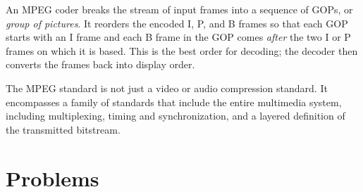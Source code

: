 An MPEG coder breaks the stream of input frames into a sequence of
GOPs, or \emph{group of pictures}.  It reorders the encoded I, P, and
B frames so that each GOP starts with an I frame and each B frame in
the GOP comes \emph{after} the two I or P frames on which it is
based. This is the best order for decoding; the decoder then converts
the frames back into display order.

The MPEG standard is not just a video or audio compression
standard. It encompasses a family of standards that include the entire 
multimedia system, including multiplexing, timing and synchronization, 
and a layered definition of the transmitted bitstream.

\section{Problems}

